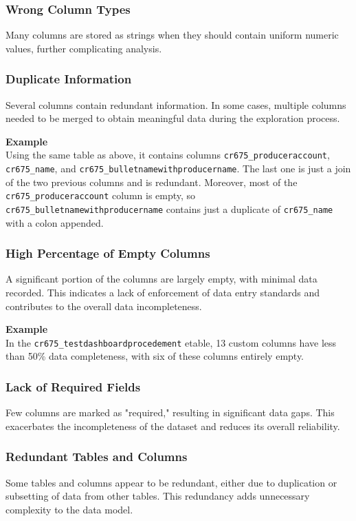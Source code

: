 \subsubsection{Wrong Column Types}
Many columns are stored as strings when they should contain uniform numeric values, further complicating analysis.

\newpage

\subsubsection{Duplicate Information}
Several columns contain redundant information. In some cases, multiple columns needed to be merged to obtain meaningful data during the exploration process.

\textbf{Example}\\
Using the same table as above, it contains columns \texttt{cr675\_produceraccount}, \texttt{cr675\_name}, and \texttt{cr675\_bulletnamewithproducername}. The last one is just a join of the two previous columns and is redundant. Moreover, most of the \texttt{cr675\_produceraccount} column is empty, so \texttt{cr675\_bulletnamewithproducername} contains just a duplicate of \texttt{cr675\_name} with a colon appended.

\subsubsection{High Percentage of Empty Columns}
A significant portion of the columns are largely empty, with minimal data recorded. This indicates a lack of enforcement of data entry standards and contributes to the overall data incompleteness.

\textbf{Example}\\
In the \texttt{cr675\_testdashboardprocedement} etable, 13 custom columns have less than 50\% data completeness, with six of these columns entirely empty.

\subsubsection{Lack of Required Fields}
Few columns are marked as "required," resulting in significant data gaps. This exacerbates the incompleteness of the dataset and reduces its overall reliability.

\subsubsection{Redundant Tables and Columns}
Some tables and columns appear to be redundant, either due to duplication or subsetting of data from other tables. This redundancy adds unnecessary complexity to the data model.

